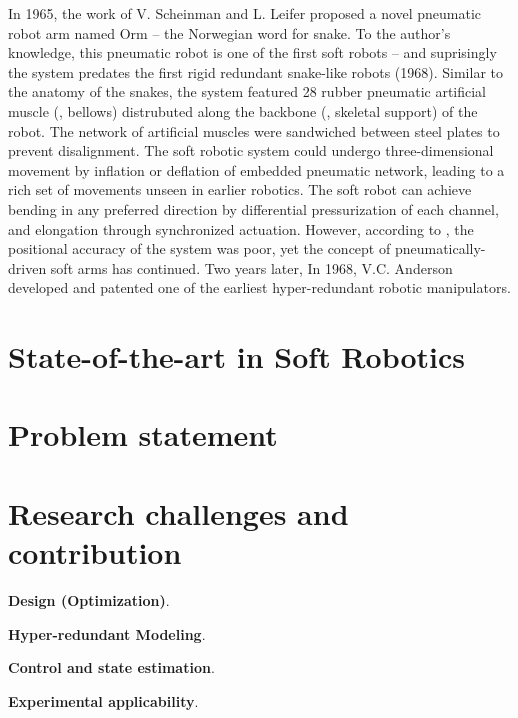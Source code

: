 In 1965, the work of V. Scheinman and L. Leifer proposed a novel pneumatic robot arm named Orm -- the Norwegian word for snake. To the author's knowledge, this pneumatic robot is one of the first soft robots -- and suprisingly the system predates the first rigid redundant snake-like robots (1968). Similar to the anatomy of the snakes, the system featured 28 rubber pneumatic artificial muscle (\ie, bellows) distrubuted along the backbone (\ie, skeletal support) of the robot. The network of artificial muscles were sandwiched between steel plates to prevent disalignment. The soft robotic system could undergo three-dimensional movement by inflation or deflation of embedded pneumatic network, leading to a rich set of movements unseen in earlier robotics. The soft robot can achieve bending in any preferred direction by differential pressurization of each channel, and elongation through synchronized actuation. However, according to \cite{}, the positional accuracy of the system was poor, yet the concept of pneumatically-driven soft arms has continued. Two years later, In 1968, V.C. Anderson developed and patented one of the earliest hyper-redundant robotic manipulators.

\clearpage
\section{State-of-the-art in Soft Robotics}

\section{Problem statement}

\section{Research challenges and contribution}
\noindent \textbf{Design (Optimization)}.


\noindent \textbf{Hyper-redundant Modeling}.

\noindent \textbf{Control and state estimation}.

\noindent \textbf{Experimental applicability}.

